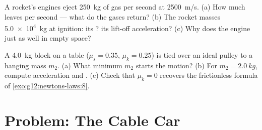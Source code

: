 \begin{exercise}[$\star\star\star$]\label{exo:g12:newtons-laws:14}
A rocket's engines eject \qty{250}{kg} of gas per second at \qty{2500}{m/s}. (a) How
much  leaves per second --- what  do the gases return? (b) The rocket
masses \qty{5.0e4}{kg} at ignition: its ? its lift-off acceleration? (c) Why
does the engine  just as well in empty space?
\end{exercise}

\begin{exercise}[$\star\star\star$]\label{exo:g12:newtons-laws:15}
A \qty{4.0}{kg} block on a table ($\mu_s = 0.35$, $\mu_k = 0.25$) is tied over an
ideal pulley to a hanging mass $m_2$. (a) What minimum $m_2$ starts the motion?
(b) For $m_2 = \qty{2.0}{kg}$, compute acceleration and . (c) Check that
$\mu_k = 0$ recovers the frictionless formula of \cref{exo:g12:newtons-laws:8}.
\end{exercise}

\section{Problem: The Cable Car}

